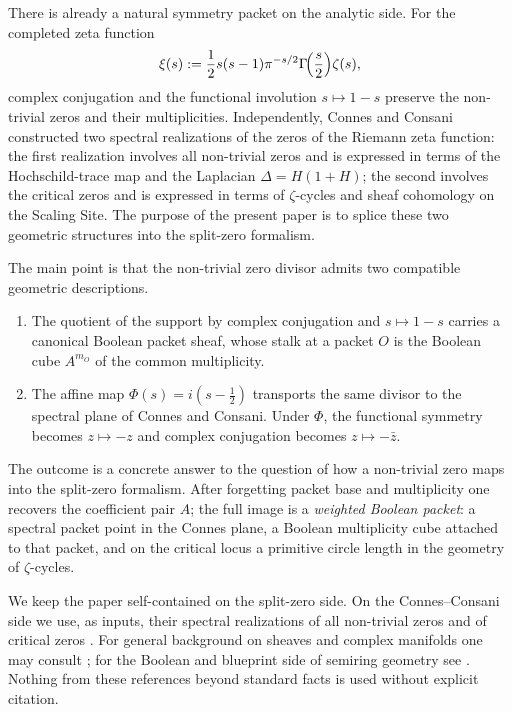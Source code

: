 \documentclass[11pt,a4paper]{article}
\numberwithin{equation}{section}
\theoremstyle{definition}
\theoremstyle{remark}
\begin{document}
There is already a natural symmetry packet on the analytic side.  For the completed zeta function
\[
\xi(s):=\frac12 s(s-1)\pi^{-s/2}\Gamma\!\Bigl(\frac s2\Bigr)\zeta(s),
\]
complex conjugation and the functional involution $s\mapsto 1-s$ preserve the non-trivial zeros and their multiplicities.  Independently, Connes and Consani constructed two spectral realizations of the zeros of the Riemann zeta function: the first realization involves all non-trivial zeros and is expressed in terms of the Hochschild-trace map and the Laplacian $\Delta=H(1+H)$; the second involves the critical zeros and is expressed in terms of $\zeta$-cycles and sheaf cohomology on the Scaling Site.  The purpose of the present paper is to splice these two geometric structures into the split-zero formalism.

The main point is that the non-trivial zero divisor admits two compatible geometric descriptions.

\begin{enumerate}[label=(\arabic*)]
\item The quotient of the support by complex conjugation and $s\mapsto 1-s$ carries a canonical Boolean packet sheaf, whose stalk at a packet $O$ is the Boolean cube $A^{m_O}$ of the common multiplicity.
\item The affine map $\Phi(s)=i(s-\frac12)$ transports the same divisor to the spectral plane of Connes and Consani.  Under $\Phi$, the functional symmetry becomes $z\mapsto -z$ and complex conjugation becomes $z\mapsto -\bar z$.
\end{enumerate}

The outcome is a concrete answer to the question of how a non-trivial zero maps into the split-zero formalism.  After forgetting packet base and multiplicity one recovers the coefficient pair $A$; the full image is a \emph{weighted Boolean packet}: a spectral packet point in the Connes plane, a Boolean multiplicity cube attached to that packet, and on the critical locus a primitive circle length in the geometry of $\zeta$-cycles.

We keep the paper self-contained on the split-zero side.  On the Connes--Consani side we use, as inputs, their spectral realizations of all non-trivial zeros and of critical zeros \cite{ConnesConsaniCycles}.  For general background on sheaves and complex manifolds one may consult \cite{Lee}; for the Boolean and blueprint side of semiring geometry see \cite{Lorscheid}.  Nothing from these references beyond standard facts is used without explicit citation.
\end{document}
